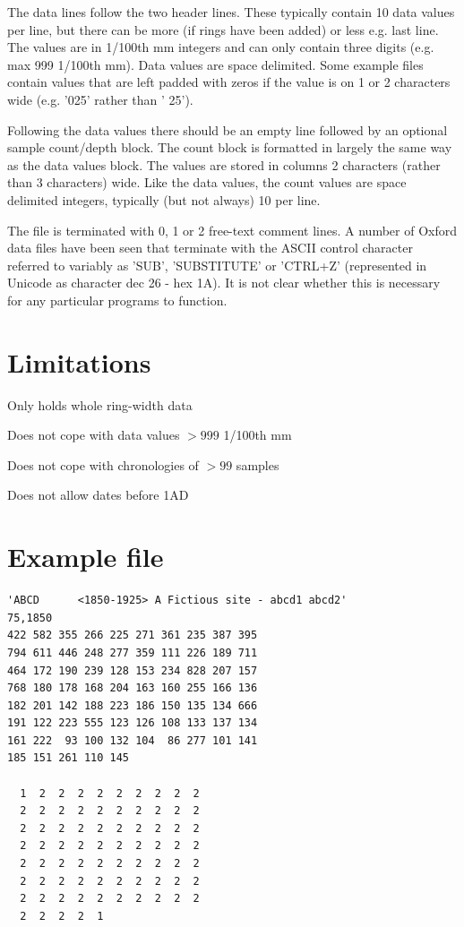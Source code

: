 The data lines follow the two header lines. These typically contain 10 data values per line, but there can be more (if rings have been added) or less e.g. last line. The values are in 1/100th mm integers and can only contain three digits (e.g. max 999 1/100th mm). Data values are space delimited. Some example files contain values that are left padded with zeros if the value is on 1 or 2 characters wide (e.g. '025' rather than ' 25').

Following the data values there should be an empty line followed by an optional sample count/depth block. The count block is formatted in largely the same way as the data values block. The values are stored in columns 2 characters (rather than 3 characters) wide. Like the data values, the count values are space delimited integers, typically (but not always) 10 per line.

The file is terminated with 0, 1 or 2 free-text comment lines. A number of Oxford data files have been seen that terminate with the ASCII control character referred to variably as 'SUB', 'SUBSTITUTE' or 'CTRL+Z' (represented in Unicode as character dec 26 - hex 1A). It is not clear whether this is necessary for any particular programs to function. 

\section{Limitations}

\begin{itemize*}
 \item Only holds whole ring-width data
 \item Does not cope with data values $>999$ 1/100th mm
 \item Does not cope with chronologies of $>99$ samples
 \item Does not allow dates before 1AD
\end{itemize*}

\newpage
\section{Example file}

\begin{lstlisting}
'ABCD      <1850-1925> A Fictious site - abcd1 abcd2'
75,1850 
422 582 355 266 225 271 361 235 387 395 
794 611 446 248 277 359 111 226 189 711 
464 172 190 239 128 153 234 828 207 157 
768 180 178 168 204 163 160 255 166 136 
182 201 142 188 223 186 150 135 134 666 
191 122 223 555 123 126 108 133 137 134 
161 222  93 100 132 104  86 277 101 141 
185 151 261 110 145 

  1  2  2  2  2  2  2  2  2  2
  2  2  2  2  2  2  2  2  2  2
  2  2  2  2  2  2  2  2  2  2
  2  2  2  2  2  2  2  2  2  2
  2  2  2  2  2  2  2  2  2  2
  2  2  2  2  2  2  2  2  2  2
  2  2  2  2  2  2  2  2  2  2
  2  2  2  2  1
\end{lstlisting}


